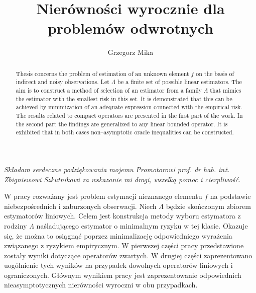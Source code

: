 \documentclass[man,mfiu]{mgrwms}
\begin{document}
\title{Nierówności wyrocznie dla problemów odwrotnych}
\author{Grzegorz Mika}

\maketitle
\newpage
\begin{minipage}[t]{0.5\textwidth}
\end{minipage}
\begin{minipage}[t]{0.5\textwidth}
\end{minipage}
\begin{flushright}
\vfill
\textit{Składam serdeczne podziękowania mojemu Promotorowi prof. dr hab. inż. Zbigniewowi Szkutnikowi za wskazanie mi drogi, wszelką pomoc  i cierpliwość.}
\end{flushright}
\tableofcontents
\begin{streszczenie}
W pracy rozważany jest problem estymacji nieznanego elementu $f$ na podstawie niebezpośrednich i zaburzonych obserwacji. Niech $\Lambda$ będzie skończonym zbiorem estymatorów liniowych. Celem jest konstrukcja metody wyboru estymatora z rodziny $\Lambda$ naśladującego estymator o minimalnym ryzyku w tej klasie. Okazuje się, że można to osiągnąć poprzez minimalizację odpowiedniego wyrażenia związanego z ryzykiem empirycznym. W pierwszej części pracy przedstawione zostały wyniki dotyczące operatorów zwartych. W drugiej części zaprezentowano uogólnienie tych wyników  na przypadek dowolnych operatorów liniowych i ograniczonych. Głównym wynikiem pracy jest zaprezentowanie odpowiednich nieasymptotycznych nierówności wyroczni w obu przypadkach.
\end{streszczenie}

\begin{abstract}
Thesis concerns the problem of estimation of an unknown element $f$ on the basis of indirect and noisy observations. Let $\Lambda$ be a finite set of possible linear estimators. The aim is to construct a method of selection of an estimator from a family $\Lambda$ that mimics the estimator with the smallest risk in this set. It is demonstrated that this can be achieved by minimization of an adequate expression connected with the empirical risk. The results related to compact operators are presented in the first part of the work. In the second part the findings are generalized to any linear bounded operator. It is exhibited that in both cases non--asymptotic oracle inequalities can be constructed.

\end{abstract}
\end{document}
